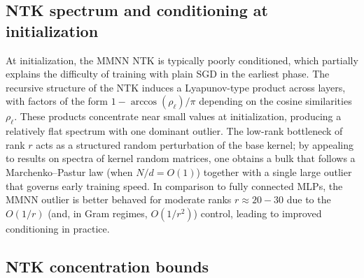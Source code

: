 \documentclass{article}
\begin{document}
\subsection{NTK spectrum and conditioning at initialization}
At initialization, the MMNN NTK is typically poorly conditioned, which partially explains the difficulty of training with plain SGD in the earliest phase. The recursive structure of the NTK induces a Lyapunov-type product across layers, with factors of the form \( 1-\arccos(\rho_\ell)/\pi \) depending on the cosine similarities \( \rho_\ell \). These products concentrate near small values at initialization, producing a relatively flat spectrum with one dominant outlier. The low-rank bottleneck of rank \( r \) acts as a structured random perturbation of the base kernel; by appealing to results on spectra of kernel random matrices, one obtains a bulk that follows a Marchenko–Pastur law (when \( N/d = O(1) \)) together with a single large outlier that governs early training speed. In comparison to fully connected MLPs, the MMNN outlier is better behaved for moderate ranks \( r\approx 20{-}30 \) due to the \( O(1/r) \) (and, in Gram regimes, \( O(1/r^2) \)) control, leading to improved conditioning in practice.

\vspace{1em}
\subsection{NTK concentration bounds}
\end{document}
